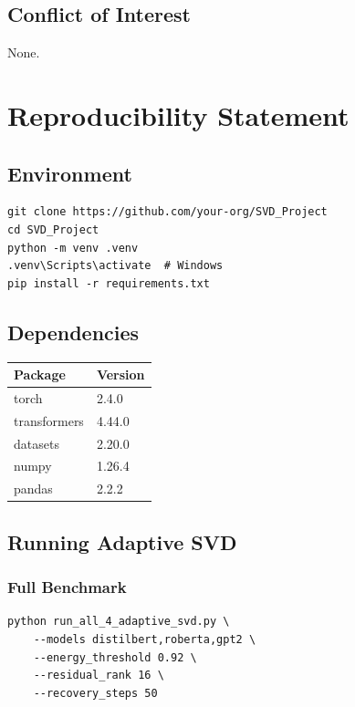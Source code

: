 \subsection{Conflict of Interest}

None.


\section{Reproducibility Statement}

\subsection{Environment}

\begin{lstlisting}
git clone https://github.com/your-org/SVD_Project
cd SVD_Project
python -m venv .venv
.venv\Scripts\activate  # Windows
pip install -r requirements.txt
\end{lstlisting}

\subsection{Dependencies}

\begin{table}[H]
\centering
\small
\begin{tabular}{ll}
\toprule
\textbf{Package} & \textbf{Version} \\
\midrule
torch & 2.4.0 \\
transformers & 4.44.0 \\
datasets & 2.20.0 \\
numpy & 1.26.4 \\
pandas & 2.2.2 \\
\bottomrule
\end{tabular}
\end{table}

\subsection{Running Adaptive SVD}

\subsubsection{Full Benchmark}

\begin{lstlisting}
python run_all_4_adaptive_svd.py \
    --models distilbert,roberta,gpt2 \
    --energy_threshold 0.92 \
    --residual_rank 16 \
    --recovery_steps 50
\end{lstlisting}

